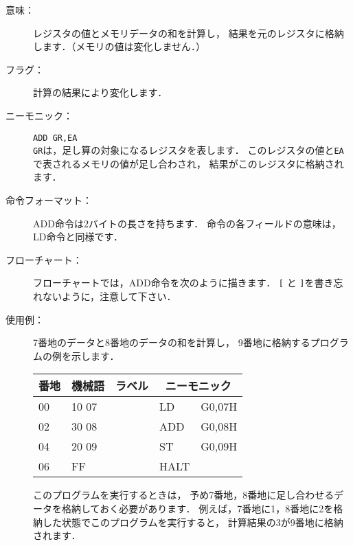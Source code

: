 \begin{description}
\item[意味：]レジスタの値とメモリデータの和を計算し，
  結果を元のレジスタに格納します．（メモリの値は変化しません．）
  
\item[フラグ：]計算の結果により変化します．

\item[ニーモニック：]\texttt{ADD  GR,EA} \\
  \texttt{GR}は，足し算の対象になるレジスタを表します．
  このレジスタの値と\texttt{EA}で表されるメモリの値が足し合わされ，
  結果がこのレジスタに格納されます．

\item[命令フォーマット：]ADD命令は2バイトの長さを持ちます．
  命令の各フィールドの意味は，LD命令と同様です．


\item[フローチャート：]フローチャートでは，ADD命令を次のように描きます．
  \texttt{[} と \texttt{]}を書き忘れないように，注意して下さい．

  \begin{center}
  \end{center}

\item[使用例：]
  7番地のデータと8番地のデータの和を計算し，
  9番地に格納するプログラムの例を示します．

  {\ttfamily\small\begin{center}
    \begin{tabular}{|l|l|l|l l|} \hline
      番地 & 機械語 & ラベル & \multicolumn{2}{|c|}{ニーモニック} \\
      \hline
      00 & 10 07 & & LD   & G0,07H \\
      02 & 30 08 & & ADD  & G0,08H \\
      04 & 20 09 & & ST   & G0,09H \\
      06 & FF    & & HALT & \\
      \hline
    \end{tabular}
  \end{center}}

  このプログラムを実行するときは，
  予め7番地，8番地に足し合わせるデータを格納しておく必要があります．
  例えば，7番地に1，8番地に2を格納した状態でこのプログラムを実行すると，
  計算結果の3が9番地に格納されます．
\end{description}

